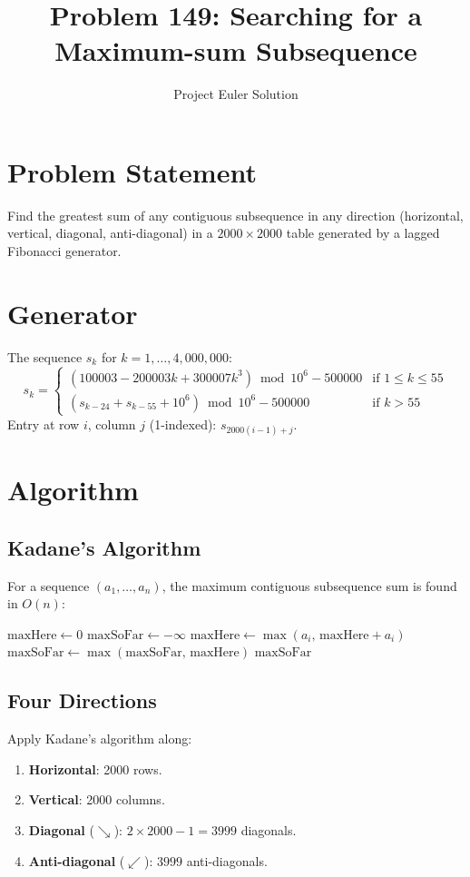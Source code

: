 \documentclass[12pt]{article}
\title{Problem 149: Searching for a Maximum-sum Subsequence}
\author{Project Euler Solution}
\date{}
\begin{document}
\maketitle

\section{Problem Statement}
Find the greatest sum of any contiguous subsequence in any direction (horizontal, vertical, diagonal, anti-diagonal) in a $2000 \times 2000$ table generated by a lagged Fibonacci generator.

\section{Generator}
The sequence $s_k$ for $k = 1, \ldots, 4{,}000{,}000$:
\[
s_k = \begin{cases}
(100003 - 200003k + 300007k^3) \bmod 10^6 - 500000 & \text{if } 1 \le k \le 55 \\
(s_{k-24} + s_{k-55} + 10^6) \bmod 10^6 - 500000 & \text{if } k > 55
\end{cases}
\]
Entry at row $i$, column $j$ (1-indexed): $s_{2000(i-1)+j}$.

\section{Algorithm}

\subsection{Kadane's Algorithm}
For a sequence $(a_1, \ldots, a_n)$, the maximum contiguous subsequence sum is found in $O(n)$:
\begin{algorithmic}
\State $\text{maxHere} \gets 0$
\State $\text{maxSoFar} \gets -\infty$
    \State $\text{maxHere} \gets \max(a_i,\, \text{maxHere} + a_i)$
    \State $\text{maxSoFar} \gets \max(\text{maxSoFar},\, \text{maxHere})$
\EndFor
\State \Return $\text{maxSoFar}$
\end{algorithmic}

\subsection{Four Directions}
Apply Kadane's algorithm along:
\begin{enumerate}
    \item \textbf{Horizontal}: 2000 rows.
    \item \textbf{Vertical}: 2000 columns.
    \item \textbf{Diagonal} ($\searrow$): $2 \times 2000 - 1 = 3999$ diagonals.
    \item \textbf{Anti-diagonal} ($\swarrow$): $3999$ anti-diagonals.
\end{enumerate}
\end{document}
